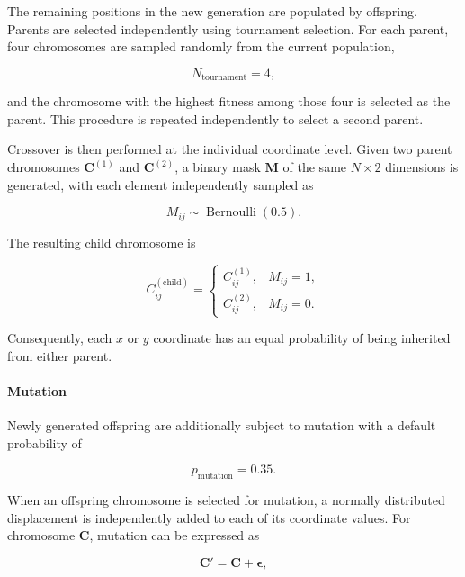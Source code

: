 \documentclass[11pt]{article}
\begin{document}
The remaining positions in the new generation are populated by offspring. Parents are selected independently using tournament selection. For each parent, four chromosomes are sampled randomly from the current population,

\begin{equation}
    N_{\mathrm{tournament}} = 4,
\end{equation}

and the chromosome with the highest fitness among those four is selected as the parent. This procedure is repeated independently to select a second parent.

Crossover is then performed at the individual coordinate level. Given two parent chromosomes $\mathbf{C}^{(1)}$ and $\mathbf{C}^{(2)}$, a binary mask $\mathbf{M}$ of the same $N\times2$ dimensions is generated, with each element independently sampled as

\begin{equation}
    M_{ij} \sim \operatorname{Bernoulli}(0.5).
\end{equation}

The resulting child chromosome is

\begin{equation}
    C^{(\mathrm{child})}_{ij}
    =
    \begin{cases}
        C^{(1)}_{ij}, & M_{ij}=1,\\
        C^{(2)}_{ij}, & M_{ij}=0.
    \end{cases}
    \label{eq:crossover}
\end{equation}

Consequently, each $x$ or $y$ coordinate has an equal probability of being inherited from either parent.

\paragraph{Mutation}

Newly generated offspring are additionally subject to mutation with a default probability of

\begin{equation}
    p_{\mathrm{mutation}} = 0.35.
\end{equation}

When an offspring chromosome is selected for mutation, a normally distributed displacement is independently added to each of its coordinate values. For chromosome $\mathbf{C}$, mutation can be expressed as

\begin{equation}
    \mathbf{C}'
    =
    \mathbf{C}
    +
    \boldsymbol{\epsilon},
\end{equation}
\end{document}
